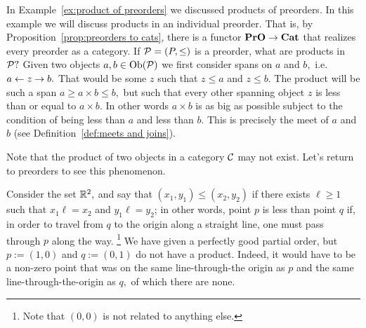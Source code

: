 \documentclass[CT4S-EN-RU]{subfiles}
\begin{document}
\begin{remarkRUS}\label{rem:gateway}
\end{remarkRUS}

\begin{exampleENG}
In Example~\ref{ex:product of preorders} we discussed products of preorders. In this example we will discuss products in an individual preorder. That is, by Proposition~\ref{prop:preorders to cats}, there is a functor ${\mathbf{PrO}}\rightarrow{\mathbf{Cat}}$ that realizes every preorder as a category. If $\mathcal{P}=(P,\leq)$ is a preorder, what are products in $\mathcal{P}?$ Given two objects $a,b\in\textnormal{Ob}(\mathcal{P})$ we first consider spans on $a$ and $b,$ i.e. $a\leftarrow z\rightarrow b.$ That would be some $z$ such that $z\leq a$ and $z\leq b.$ The product will be such a span $a\geq a\times b\leq b,$ but such that every other spanning object $z$ is less than or equal to $a\times b.$ In other words $a\times b$ is as big as possible subject to the condition of being less than $a$ and less than $b.$ This is precisely the meet of $a$ and $b$ (see Definition~\ref{def:meets and joins}). 
\end{exampleENG}

\begin{exampleRUS}
\end{exampleRUS}

\begin{exampleENG}\label{ex:products dont exist}
Note that the product of two objects in a category $\mathcal{C}$ may not exist. Let's return to preorders to see this phenomenon.

Consider the set ${\mathbb R}^2,$ and say that $(x_1,y_1)\leq (x_2,y_2)$ if there exists $\ell\geq 1$ such that $x_1\ell=x_2$ and $y_1\ell=y_2$; in other words, point $p$ is less than point $q$ if, in order to travel from $q$ to the origin along a straight line, one must pass through $p$ along the way. 
\footnote{Note that $(0,0)$ is not related to anything else.} 
We have given a perfectly good partial order, but $p:=(1,0)$ and $q:=(0,1)$ do not have a product. Indeed, it would have to be a non-zero point that was on the same line-through-the origin as $p$ and the same line-through-the-origin as $q,$ of which there are none.
\end{exampleENG}

\begin{exampleRUS}\label{ex:products dont exist}
\end{exampleRUS}
\end{document}
